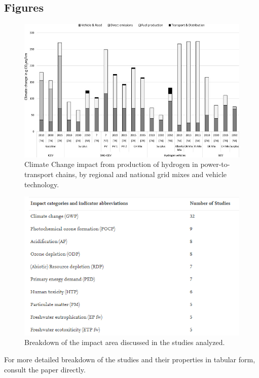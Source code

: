 \documentclass[a4paper]{article}
\begin{document}
\subsection{Figures}
\begin{figure}[h!]
    \centering
    \includegraphics[scale=0.7]{hydrogen emissions vs grid mix and transport type.jpg}
    \caption{Climate Change impact from production of hydrogen in power-to-transport chains, by regional and national grid mixes and vehicle technology.}
    \label{fig:1}
\end{figure}
\begin{figure}[h!]
    \centering
    \includegraphics[scale=0.7]{impact area breakdown.PNG}
    \caption{Breakdown of the impact area discussed in the studies analyzed.}
    \label{fig:2}
\end{figure}
For more detailed breakdown of the studies and their properties in tabular form, consult the paper directly.
\end{document}
